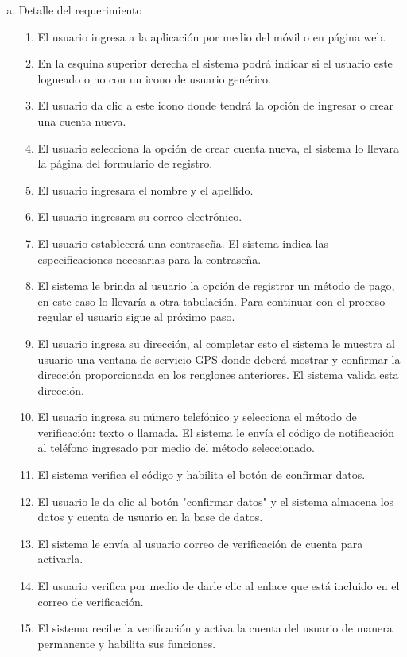 \documentclass[conference]{IEEEtran}
\begin{document}
\begin{enumerate}
\begin{enumerate}[a)]
\item Detalle del requerimiento
	\begin{enumerate}[P{a}so 1.]
\item El usuario ingresa a la aplicación por medio del móvil o en página web.
\item En la esquina superior derecha el sistema podrá indicar si el usuario este logueado o no con un icono de usuario genérico.
\item El usuario da clic a este icono donde tendrá la opción de ingresar o crear una cuenta nueva.
\item El usuario selecciona la opción de crear cuenta nueva, el sistema lo llevara la página del formulario de registro.
\item El usuario ingresara el nombre y el apellido.
\item El usuario ingresara su correo electrónico.
\item El usuario establecerá una contraseña. El sistema indica las especificaciones necesarias para la contraseña.
\item El sistema le brinda al usuario la opción de registrar un método de pago, en este caso lo llevaría a otra tabulación. Para continuar con el proceso regular el usuario sigue al próximo paso.
\item El usuario ingresa su dirección, al completar esto el sistema le muestra al usuario una ventana de servicio GPS donde deberá mostrar y confirmar la dirección proporcionada en los renglones anteriores. El sistema valida esta dirección.
\item El usuario ingresa su número telefónico y selecciona el método de verificación: texto o llamada. El sistema le envía el código de notificación al teléfono ingresado por medio del método seleccionado.
\item El sistema verifica el código y habilita el botón de confirmar datos.
\item El usuario le da clic al botón "confirmar datos" y el sistema almacena los datos y cuenta de usuario en la base de datos.
\item El sistema le envía al usuario correo de verificación de cuenta para activarla.
\item El usuario verifica por medio de darle clic al enlace que está incluido en el correo de verificación.
\item El sistema recibe la verificación y activa la cuenta del usuario de manera permanente y habilita sus funciones.
	\end{enumerate}
	

\end{enumerate}
\end{enumerate}
\end{document}
